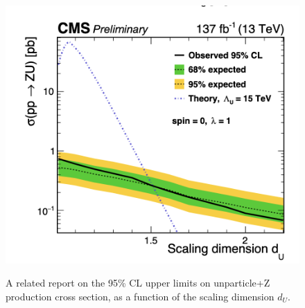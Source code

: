\begin{figure}[!htbp]
    \centering
    \caption{A related report on the 95\% CL upper limits on unparticle+Z~\cite{CMS:2020ulv} production cross section, as a function of the scaling dimension $d_U$.}
    \includegraphics[scale=0.7]{fig/Unparticles.png}  
    \label{fig:UnparZMET}
\end{figure}

\newpage



% 
% 


